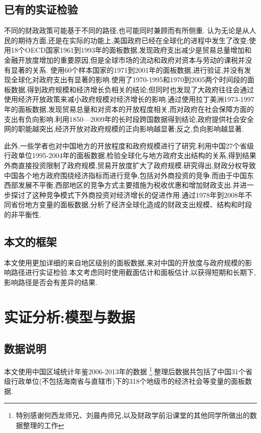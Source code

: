 \documentclass[10pt]{article}
\begin{document}
\subsection{已有的实证检验}
不同的财政政策可能基于不同的路径,也可能同时兼顾而有所侧重.\cite{kettl2000transformation} 认为无论是从人民的期待方面,还是在实际的功能上,美国政府已经在全球化的进程中发生了改变;\cite{garrett2001globalization}使用18个OECD国家1961到1993年的面板数据,发现政府支出减少是贸易总量增加和金融开放度增加的重要原因,但是全球市场的流动和政府对资本与劳动的课税并没有显著的关系.\cite{dreher2008impact} 使用60个样本国家的1971到2001年的面板数据,进行验证,并没有发现全球化对政府支出有显著的影响.\cite{bergh2010government}使用了1970-1995和1970到2005两个时间段的面板数据,得到政府规模和经济增长负相关的结论;但同时也发现了大政府往往会通过使用经济开放政策来减小政府规模对经济增长的影响.\cite{kaufman2001globalization}通过使用拉丁美洲1973-1997年的面板数据,发现贸易总量和对资本的开放程度相关,而对政府在社会保障方面的支出有负向影响.\cite{maojie2015}利用1850—2009年的长时段跨国数据得到结论,政府提供社会安全网的职能越突出,经济开放对政府规模的正向影响越显著;反之,负向影响越显著.


此外,一些学者也对中国地方的开放程度和政府规模进行了研究.\cite{cai2008}利用中国27个省级行政单位1995-2004年的面板数据,检验全球化与地方政府支出结构的关系,得到结果外商直接投资限制了政府规模,贸易开放度扩大了政府规模.\cite{wang2007}研究得出,财政分权导致中国各个地方政府围绕经济指标而进行竞争,包括对外商投资的竞争.而由于中国东西部发展不平衡,西部地区的竞争方式主要措施为税收优惠和增加财政支出.并进一步探讨了这种竞争模式下外商投资对经济增长的促进作用.\cite{sheng2010}通过1978年到2008年不同省份地方变量的面板数据,分析了经济全球化造成的财政支出规模、结构和时段的非平衡性.
\subsection{本文的框架}
本文使用更加详细的来自地区级别的面板数据,来对中国的开放度与政府规模的影响路径进行实证检验.本文考虑同时使用截面估计和面板估计,以获得短期和长期下,影响路径是否会有差异的结果.

\section{实证分析:模型与数据}
\subsection{数据说明}
本文使用中国区域统计年鉴2006-2013年的数据
\footnote{特别感谢何西龙师兄、刘晨冉师兄,以及财政学前沿课堂的其他同学所做出的数据整理的工作}.整理后数据共包括了中国31个省级行政单位(不包括海南省与直辖市)下的318个地级市的经济社会等变量的面板数据.
\end{document}
